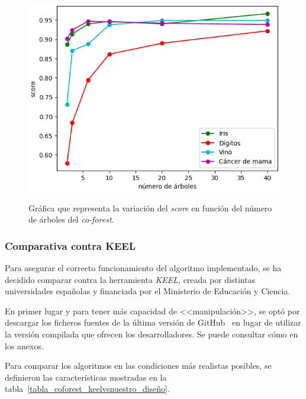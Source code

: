 \begin{figure}[h]
	\caption{Gráfica que representa la variación del \textit{score} en función del número de árboles del \textit{co-forest}.}
	\centering
	\includegraphics[scale=0.75]{../img/memoria/5_coforest_score-arboles}
	\label{5_score-arboles}
\end{figure}

\subsubsection{Comparativa contra KEEL}

Para asegurar el correcto funcionamiento del algoritmo implementado, se ha decidido comparar contra la herramienta \textit{KEEL}, creada por distintas universidades españolas y financiada por el Ministerio de Educación y Ciencia.

En primer lugar y para tener más capacidad de <<manipulación>>, se optó por descargar los ficheros fuentes de la última versión de GitHub~\cite{keelRepo} en lugar de utilizar la versión compilada que ofrecen los desarrolladores. Se puede consultar cómo en los anexos.

Para comparar los algoritmos en las condiciones más realistas posibles, se definieron las características mostradas en la tabla~\ref{tabla_coforest_keelvsnuestro_diseño}.

